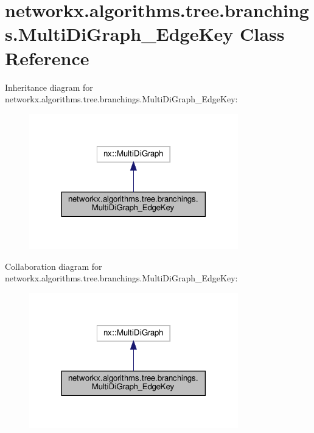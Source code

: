 \hypertarget{classnetworkx_1_1algorithms_1_1tree_1_1branchings_1_1MultiDiGraph__EdgeKey}{}\section{networkx.\+algorithms.\+tree.\+branchings.\+Multi\+Di\+Graph\+\_\+\+Edge\+Key Class Reference}
\label{classnetworkx_1_1algorithms_1_1tree_1_1branchings_1_1MultiDiGraph__EdgeKey}


Inheritance diagram for networkx.\+algorithms.\+tree.\+branchings.\+Multi\+Di\+Graph\+\_\+\+Edge\+Key\+:
\nopagebreak
\begin{figure}[H]
\begin{center}
\leavevmode
\includegraphics[width=257pt]{classnetworkx_1_1algorithms_1_1tree_1_1branchings_1_1MultiDiGraph__EdgeKey__inherit__graph}
\end{center}
\end{figure}


Collaboration diagram for networkx.\+algorithms.\+tree.\+branchings.\+Multi\+Di\+Graph\+\_\+\+Edge\+Key\+:
\nopagebreak
\begin{figure}[H]
\begin{center}
\leavevmode
\includegraphics[width=257pt]{classnetworkx_1_1algorithms_1_1tree_1_1branchings_1_1MultiDiGraph__EdgeKey__coll__graph}
\end{center}
\end{figure}
